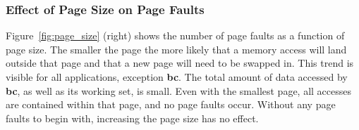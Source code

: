
\subsubsection{Effect of Page Size on Page Faults}

Figure~\ref{fig:page_size} (right) shows the number of page faults as a
function of page size.
%
The smaller the page the more likely that a memory access will land
outside that page and that a new page will need to be swapped in.
%
This trend is visible for all applications, exception \textbf{bc}. The total
amount of data accessed by \textbf{bc}, as well as its working set, is small.
Even with the smallest page, all accesses are contained within that page, and
no page faults occur. Without any page faults to begin with, increasing the
page size has no effect.

%

